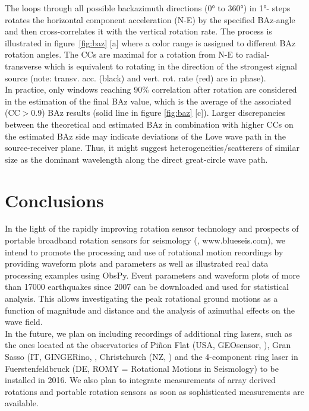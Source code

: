 \documentclass[12pt,reqno,letter]{article}
\begin{document}
The  loops through all possible backazimuth directions (0° to 360°) in 1°- steps rotates the horizontal component acceleration (N-E) by the specified BAz-angle and then cross-correlates it with the vertical rotation rate. The process is illustrated in figure~\ref{fig:baz} [a] where a color range is assigned to different BAz rotation angles.  The CCs are maximal for a rotation from N-E to radial-transverse which is equivalent to rotating in the direction of the strongest signal source (note: transv. acc. (black) and vert. rot. rate (red) are in phase).\\ 
In practice, only windows reaching 90\% correlation after rotation are considered in the estimation of the final BAz value, which is the average of the associated (CC$>$0.9) BAz results (solid line in figure \ref{fig:baz} [c]). 
Larger discrepancies between the theoretical and estimated BAz in combination with higher CCs on the estimated BAz side may indicate deviations of the Love wave path in the source-receiver plane. Thus, it might suggest heterogeneities/scatterers of similar size as the dominant wavelength along the direct great-circle wave path.\\
%
%
\section*{Conclusions}
In the light of the rapidly improving rotation sensor technology and prospects of portable broadband rotation sensors for seismology (\cite{Bernauer2016}, www.blueseis.com), we intend to promote the processing and use of rotational motion recordings by providing  waveform plots and parameters as well as illustrated real data processing examples using ObsPy. Event parameters and waveform plots of more than 17000 earthquakes since 2007 can be downloaded and used for statistical analysis. This allows investigating the peak rotational ground motions as a function of magnitude and distance and the analysis of azimuthal effects on the wave field.\\
In the future, we plan on including recordings of additional ring lasers, such as the ones located at the observatories of Pi\~{n}on Flat (USA, GEOsensor, \cite{Schreiber2003b}), Gran Sasso (IT, GINGERino, \cite{Ortolan2016}, Christchurch (NZ, \cite{Schreiber2003}) and the 4-component ring laser in Fuerstenfeldbruck (DE, ROMY = Rotational Motions in Seismology) to be installed in 2016. We also plan to integrate measurements of array derived rotations and portable rotation sensors as soon as sophisticated measurements are available.
\end{document}
